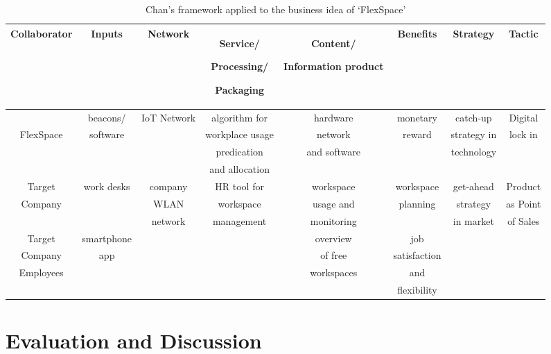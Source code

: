 			\begin{table}[h!]
			\scriptsize
			\centering			
			\caption{Chan's framework applied to the business idea of `FlexSpace'}
			\label{tab:use_case_chan}
			\centering
			\vspace{0.2cm}
			               
			\begin{tabular}{| c | c | c | c | c | c | c | c |}
			\hline
			\rule{0pt}{8pt}
			Collaborator & Inputs & Network & \parbox[m]{0.6in}{\centering\strut Service/ \par Processing/ \par Packaging \strut} & \parbox[m]{0.6in}{\centering\strut Content/ \par Information product \strut} & Benefits & Strategy & Tactic\\
			\hline
			 		  & beacons/ & IoT Network & algorithm for   & hardware 	& monetary  & catch-up    & Digital \\
			FlexSpace & software &             & workplace usage & network      & reward    & strategy in & lock in \\
			          &          &             & predication     & and software &           & technology  &         \\
			          &          &             & and allocation  &              &           &             &         \\
			\hline
			Target	  & work desks & company   & HR tool for     & workspace    & workspace & get-ahead	  & Product  \\
			Company   &            & WLAN      & workspace       & usage and    & planning  & strategy    & as Point \\
			          &            & network   & management      & monitoring   &           & in market   & of Sales \\
			\hline
			Target	  & smartphone &           &                 & overview     & job          &           &         \\
			Company   & app        &           &                 & of free      & satisfaction &           &         \\
			Employees &			   &           &                 & workspaces   & and	       &           &         \\
					  &			   &		   &				 &				& flexibility  &           &         \\ \hline
			\end{tabular}
			\end{table}
\section{Evaluation and Discussion}
\label{sec:eval}
\vspace{-1em}
